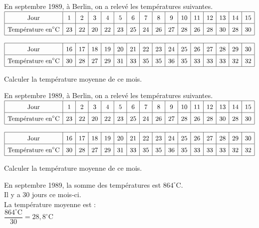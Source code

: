 \begin{exercice*}[Températures]
    En septembre 1989, à Berlin, on a relevé les températures suivantes.\\
    $\def\arraystretch{1.5}\begin{array}{|c|c|c|c|c|c|c|c|c|c|c|c|c|c|c|c|c}\hline  \text{Jour}&1&2&3&4&5&6&7&8&9&10&11&12&13&14&15\\
    \hline \text{Température en} ^\circ\text{C}&23&22&20&22&23&25&24&26&27&28&26&28&30&28&30\\
    \hline\end{array}$
    
    \medskip
    $\def\arraystretch{1.5}\begin{array}{|c|c|c|c|c|c|c|c|c|c|c|c|c|c|c|c|c}\hline  \text{Jour}&16&17&18&19&20&21&22&23&24&25&26&27&28&29&30\\
    \hline \text{Température en} ^\circ\text{C}&30&28&27&29&31&33&35&35&36&35&33&33&33&32&32\\
    \hline\end{array}$
    
    \medskip
    Calculer la température moyenne de ce mois.

\end{exercice*}
\begin{corrige}
    En septembre 1989, à Berlin, on a relevé les températures suivantes.\\
$\def\arraystretch{1.5}\begin{array}{|c|c|c|c|c|c|c|c|c|c|c|c|c|c|c|c|c}\hline  \text{Jour}&1&2&3&4&5&6&7&8&9&10&11&12&13&14&15\\
\hline \text{Température en} ^\circ\text{C}&23&22&20&22&23&25&24&26&27&28&26&28&30&28&30\\
\hline\end{array}$

\medskip
$\def\arraystretch{1.5}\begin{array}{|c|c|c|c|c|c|c|c|c|c|c|c|c|c|c|c|c}\hline  \text{Jour}&16&17&18&19&20&21&22&23&24&25&26&27&28&29&30\\
\hline \text{Température en} ^\circ\text{C}&30&28&27&29&31&33&35&35&36&35&33&33&33&32&32\\
\hline\end{array}$

\medskip
Calculer la température moyenne de ce mois.
    {\red
    \begin{spacing}{1.5}
        En septembre 1989, la somme des températures est $864^\circ\text{C}$.\\
         Il y a $30$ jours ce mois-ci.\\
         La température moyenne est :\\
        $\dfrac{864^\circ\text{C}}{30}$$=28{,}8^\circ\text{C}$
    \end{spacing}
    }
\end{corrige}

